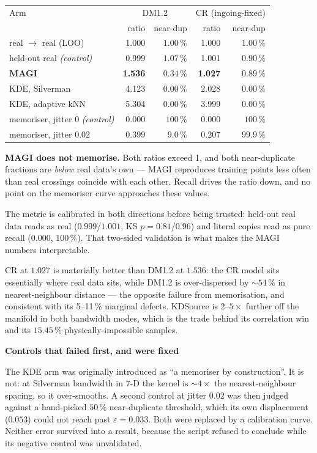 \documentclass[11pt,a4paper]{article}
\newenvironment{callout}[3]%
{\par\medskip\noindent
 \def\calloutframe{#1}\def\calloutback{#2}%
 \setlength{\fboxrule}{0.9pt}\setlength{\fboxsep}{8pt}%
 \begin{lrbox}{\calloutbox}%
 \begin{minipage}{\dimexpr\textwidth-2\fboxsep-2\fboxrule\relax}%
 \setlength{\parskip}{4pt}%
 \textcolor{#1}{\textbf{#3}}\par\nobreak\smallskip}
{\end{minipage}\end{lrbox}%
 \fcolorbox{\calloutframe}{\calloutback}{\usebox{\calloutbox}}%
 \par\medskip}
\begin{document}
\begin{center}
\begin{tabular}{lrrrr}
\toprule
Arm & \multicolumn{2}{c}{DM1.2} & \multicolumn{2}{c}{CR (ingoing-fixed)} \\
    & ratio & near-dup & ratio & near-dup \\
\midrule
real $\to$ real (LOO)      & 1.000 & $1.00\,\%$ & 1.000 & $1.00\,\%$ \\
held-out real \emph{(control)} & 0.999 & $1.07\,\%$ & 1.001 & $0.90\,\%$ \\
\textbf{MAGI}              & \textbf{1.536} & $\mathbf{0.34\,\%}$ & \textbf{1.027} & $\mathbf{0.89\,\%}$ \\
KDE, Silverman             & 4.123 & $0.00\,\%$ & 2.028 & $0.00\,\%$ \\
KDE, adaptive kNN          & 5.304 & $0.00\,\%$ & 3.999 & $0.00\,\%$ \\
memoriser, jitter 0 \emph{(control)} & 0.000 & $100\,\%$ & 0.000 & $100\,\%$ \\
memoriser, jitter 0.02     & 0.399 & $9.0\,\%$ & 0.207 & $99.9\,\%$ \\
\bottomrule
\end{tabular}
\end{center}

\textbf{MAGI does not memorise.} Both ratios exceed 1, and both near-duplicate
fractions are \emph{below} real data's own --- MAGI reproduces training points
less often than real crossings coincide with each other. Recall drives the ratio
down, and no point on the memoriser curve approaches these values.

The metric is calibrated in both directions before being trusted: held-out real
data reads as real ($0.999$/$1.001$, KS $p=0.81$/$0.96$) and literal copies read
as pure recall ($0.000$, $100\,\%$). That two-sided validation is what makes the
MAGI numbers interpretable.

CR at $1.027$ is materially better than DM1.2 at $1.536$: the CR model sits
essentially where real data sits, while DM1.2 is over-dispersed by $\sim$$54\,\%$
in nearest-neighbour distance --- the opposite failure from memorisation, and
consistent with its 5--11\,\% marginal defects. KDSource is $2$--$5\times$ further
off the manifold in both bandwidth modes, which is the trade behind its
correlation win and its $15.45\,\%$ physically-impossible samples.

\begin{callout}{warn}{red!4}{Controls that failed first, and were fixed}
The KDE arm was originally introduced as ``a memoriser by construction''. It is
not: at Silverman bandwidth in 7-D the kernel is $\sim$$4\times$ the
nearest-neighbour spacing, so it over-smooths. A second control at jitter $0.02$
was then judged against a hand-picked $50\,\%$ near-duplicate threshold, which
its own displacement ($0.053$) could not reach past $\varepsilon=0.033$. Both were
replaced by a calibration curve. Neither error survived into a result, because
the script refused to conclude while its negative control was unvalidated.
\end{callout}
\end{document}
